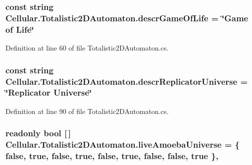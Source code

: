 \subsubsection[{descr\+Game\+Of\+Life}]{\setlength{\rightskip}{0pt plus 5cm}const string Cellular.\+Totalistic2\+D\+Automaton.\+descr\+Game\+Of\+Life = \char`\"{}Game of Life\char`\"{}\hspace{0.3cm}{\ttfamily [protected]}}\label{class_cellular_1_1_totalistic2_d_automaton_a925e29c85ea53754a86864aa9b2e27f9}


Definition at line 60 of file Totalistic2\+D\+Automaton.\+cs.

\hypertarget{class_cellular_1_1_totalistic2_d_automaton_ab93b5f3ae4587498fcccab5a77992ab9}{}
\subsubsection[{descr\+Replicator\+Universe}]{\setlength{\rightskip}{0pt plus 5cm}const string Cellular.\+Totalistic2\+D\+Automaton.\+descr\+Replicator\+Universe = \char`\"{}Replicator Universe\char`\"{}\hspace{0.3cm}{\ttfamily [protected]}}\label{class_cellular_1_1_totalistic2_d_automaton_ab93b5f3ae4587498fcccab5a77992ab9}


Definition at line 90 of file Totalistic2\+D\+Automaton.\+cs.

\hypertarget{class_cellular_1_1_totalistic2_d_automaton_a69f67fbf81c8a2c5a3700c4f9b55c596}{}
\subsubsection[{live\+Amoeba\+Universe}]{\setlength{\rightskip}{0pt plus 5cm}readonly bool \mbox{[}$\,$\mbox{]} Cellular.\+Totalistic2\+D\+Automaton.\+live\+Amoeba\+Universe = \{ false, true, false, true, false, true, false, false, true \}\hspace{0.3cm}{\ttfamily [static]}, {\ttfamily [protected]}}\label{class_cellular_1_1_totalistic2_d_automaton_a69f67fbf81c8a2c5a3700c4f9b55c596}


